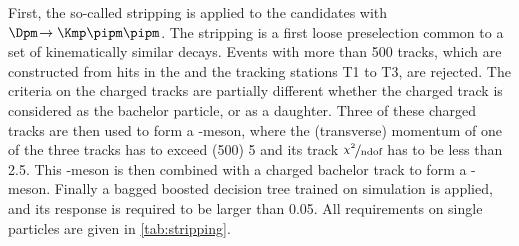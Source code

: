 First, the so-called stripping is applied to the \BdToDpi candidates with $\Dpm\!\to\Kmp\pipm\pipm$.
The stripping is a first loose preselection common to a set of kinematically similar decays.
Events with more than \num{500} tracks, which are constructed from hits in the \velo and the tracking stations T1 to T3, are rejected.
The criteria on the charged tracks are partially different whether the charged track is considered as the bachelor particle, or as a \Dm daughter.
Three of these charged tracks are then used to form a \Dm-meson, where the (transverse) momentum of one of the three tracks has to exceed (\SI[per-mode=symbol]{500}{\MeVc}) \SI[per-mode=symbol]{5}{\GeVc} and its track $\nicefrac{\chi^2}{\text{ndof}}$ has to be less than \num{2.5}.
This \Dm-meson is then combined with a charged bachelor track to form a \Bz-meson.
Finally a bagged boosted decision tree trained on simulation is applied, and its response is required to be larger than \num{0.05}.
All requirements on single particles are given in \cref{tab:stripping}.
